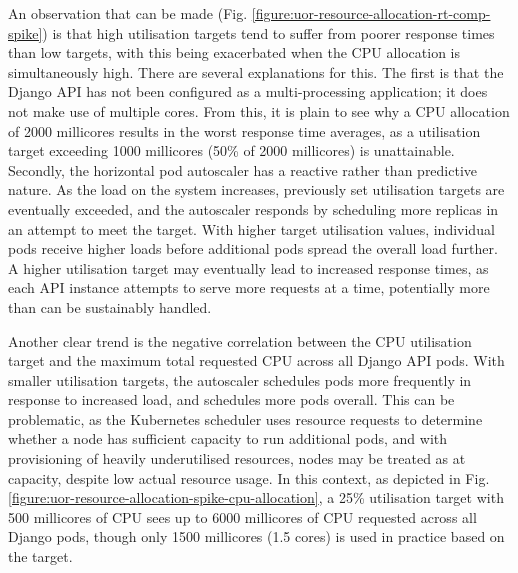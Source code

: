 An observation that can be made (Fig. \ref{figure:uor-resource-allocation-rt-comp-spike}) is that high utilisation targets tend to suffer from poorer response times than low targets, with this being exacerbated when the CPU allocation is simultaneously high. There are several explanations for this. The first is that the Django API has not been configured as a multi-processing application; it does not make use of multiple cores. From this, it is plain to see why a CPU allocation of 2000 millicores results in the worst response time averages, as a utilisation target exceeding 1000 millicores (50\% of 2000 millicores) is unattainable. Secondly, the horizontal pod autoscaler has a reactive rather than predictive nature. As the load on the system increases, previously set utilisation targets are eventually exceeded, and the autoscaler responds by scheduling more replicas in an attempt to meet the target. With higher target utilisation values, individual pods receive higher loads before additional pods spread the overall load further. A higher utilisation target may eventually lead to increased response times, as each API instance attempts to serve more requests at a time, potentially more than can be sustainably handled.

Another clear trend is the negative correlation between the CPU utilisation target and the maximum total requested CPU across all Django API pods. With smaller utilisation targets, the autoscaler schedules pods more frequently in response to increased load, and schedules more pods overall. This can be problematic, as the Kubernetes scheduler uses resource requests to determine whether a node has sufficient capacity to run additional pods, and with provisioning of heavily underutilised resources, nodes may be treated as at capacity, despite low actual resource usage. In this context, as depicted in Fig. \ref{figure:uor-resource-allocation-spike-cpu-allocation}, a 25\% utilisation target with 500 millicores of CPU sees up to 6000 millicores of CPU requested across all Django pods, though only 1500 millicores (1.5 cores) is used in practice based on the target.

